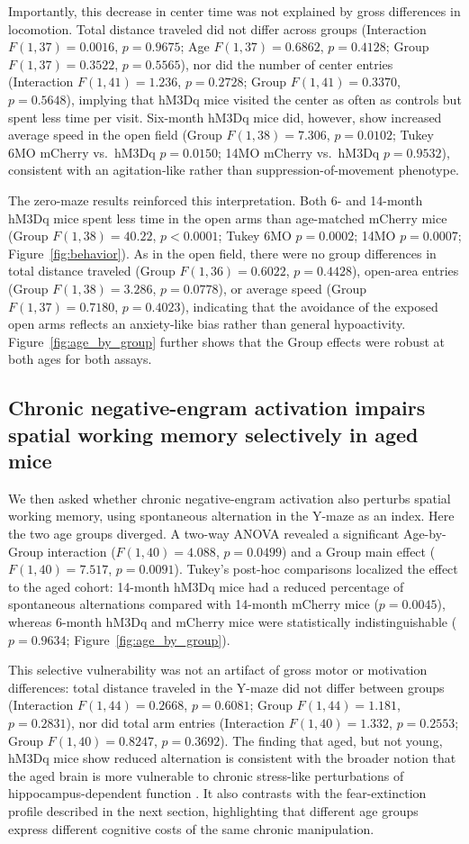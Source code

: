 \documentclass[11pt]{article}
\begin{document}
Importantly, this decrease in center time was not explained by gross differences in locomotion. Total distance traveled did not differ across groups (Interaction $F(1,37)=0.0016$, $p=0.9675$; Age $F(1,37)=0.6862$, $p=0.4128$; Group $F(1,37)=0.3522$, $p=0.5565$), nor did the number of center entries (Interaction $F(1,41)=1.236$, $p=0.2728$; Group $F(1,41)=0.3370$, $p=0.5648$), implying that hM3Dq mice visited the center as often as controls but spent less time per visit. Six-month hM3Dq mice did, however, show increased average speed in the open field (Group $F(1,38)=7.306$, $p=0.0102$; Tukey 6MO mCherry vs.~hM3Dq $p=0.0150$; 14MO mCherry vs.~hM3Dq $p=0.9532$), consistent with an agitation-like rather than suppression-of-movement phenotype.

The zero-maze results reinforced this interpretation. Both 6- and 14-month hM3Dq mice spent less time in the open arms than age-matched mCherry mice (Group $F(1,38)=40.22$, $p<0.0001$; Tukey 6MO $p=0.0002$; 14MO $p=0.0007$; Figure~\ref{fig:behavior}). As in the open field, there were no group differences in total distance traveled (Group $F(1,36)=0.6022$, $p=0.4428$), open-area entries (Group $F(1,38)=3.286$, $p=0.0778$), or average speed (Group $F(1,37)=0.7180$, $p=0.4023$), indicating that the avoidance of the exposed open arms reflects an anxiety-like bias rather than general hypoactivity. Figure~\ref{fig:age_by_group} further shows that the Group effects were robust at both ages for both assays.

\subsection{Chronic negative-engram activation impairs spatial working memory selectively in aged mice}

We then asked whether chronic negative-engram activation also perturbs spatial working memory, using spontaneous alternation in the Y-maze as an index. Here the two age groups diverged. A two-way ANOVA revealed a significant Age-by-Group interaction ($F(1,40)=4.088$, $p=0.0499$) and a Group main effect ($F(1,40)=7.517$, $p=0.0091$). Tukey's post-hoc comparisons localized the effect to the aged cohort: 14-month hM3Dq mice had a reduced percentage of spontaneous alternations compared with 14-month mCherry mice ($p=0.0045$), whereas 6-month hM3Dq and mCherry mice were statistically indistinguishable ($p=0.9634$; Figure~\ref{fig:age_by_group}).

This selective vulnerability was not an artifact of gross motor or motivation differences: total distance traveled in the Y-maze did not differ between groups (Interaction $F(1,44)=0.2668$, $p=0.6081$; Group $F(1,44)=1.181$, $p=0.2831$), nor did total arm entries (Interaction $F(1,40)=1.332$, $p=0.2553$; Group $F(1,40)=0.8247$, $p=0.3692$). The finding that aged, but not young, hM3Dq mice show reduced alternation is consistent with the broader notion that the aged brain is more vulnerable to chronic stress-like perturbations of hippocampus-dependent function \citep{sapolsky1986glucocorticoid,klempin2007neurogenesis}. It also contrasts with the fear-extinction profile described in the next section, highlighting that different age groups express different cognitive costs of the same chronic manipulation.
\end{document}
